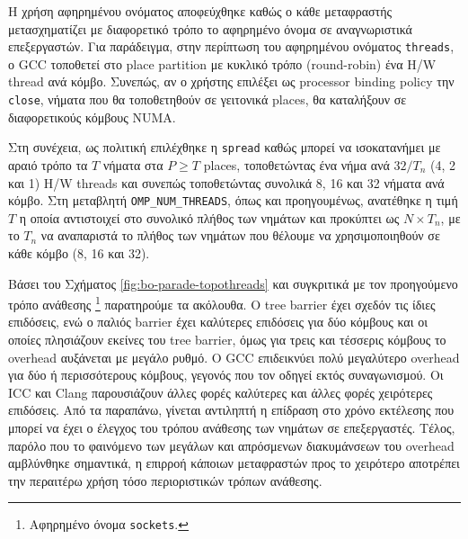 Η χρήση αφηρημένου ονόματος αποφεύχθηκε καθώς ο κάθε μεταφραστής μετασχηματίζει με διαφορετικό τρόπο το αφηρημένο όνομα σε αναγνωριστικά επεξεργαστών. Για παράδειγμα, στην περίπτωση του αφηρημένου ονόματος \texttt{threads}, ο GCC τοποθετεί στο place partition με κυκλικό τρόπο (round-robin) ένα H/W thread ανά κόμβο. Συνεπώς, αν ο χρήστης επιλέξει ως processor binding policy την \texttt{close}, νήματα που θα τοποθετηθούν σε γειτονικά places, θα καταλήξουν σε διαφορετικούς κόμβους NUMA.

Στη συνέχεια, ως πολιτική επιλέχθηκε η \texttt{spread} καθώς μπορεί να ισοκατανήμει με αραιό τρόπο τα $T$ νήματα στα $P \geq T$ places, τοποθετώντας ένα νήμα ανά $32 / T_n$ (4, 2 και 1) H/W threads και συνεπώς τοποθετώντας συνολικά 8, 16 και 32 νήματα ανά κόμβο. Στη μεταβλητή \texttt{OMP\_NUM\_THREADS}, όπως και προηγουμένως, ανατέθηκε η τιμή $T$ η οποία αντιστοιχεί στο συνολικό πλήθος των νημάτων και προκύπτει ως $N \times T_n$, με το $T_n$ να αναπαριστά το πλήθος των νημάτων που θέλουμε να χρησιμοποιηθούν σε κάθε κόμβο (8, 16 και 32).

Βάσει του Σχήματος \ref{fig:bo-parade-topothreads} και συγκριτικά με τον προηγούμενο τρόπο ανάθεσης \footnote{Αφηρημένο όνομα \texttt{sockets}.} παρατηρούμε τα ακόλουθα. Ο tree barrier έχει σχεδόν τις ίδιες επιδόσεις, ενώ ο παλιός barrier έχει καλύτερες επιδόσεις για δύο κόμβους και οι οποίες πλησιάζουν εκείνες του tree barrier, όμως για τρεις και τέσσερις κόμβους το overhead αυξάνεται με μεγάλο ρυθμό. Ο GCC επιδεικνύει πολύ μεγαλύτερο overhead για δύο ή περισσότερους κόμβους, γεγονός που τον οδηγεί εκτός συναγωνισμού. Οι ICC και Clang παρουσιάζουν άλλες φορές καλύτερες και άλλες φορές χειρότερες επιδόσεις. Από τα παραπάνω, γίνεται αντιληπτή η επίδραση στο χρόνο εκτέλεσης που μπορεί να έχει ο έλεγχος του τρόπου ανάθεσης των νημάτων σε επεξεργαστές. Τέλος, παρόλο που το φαινόμενο των μεγάλων και απρόσμενων διακυμάνσεων του overhead αμβλύνθηκε σημαντικά, η επιρροή κάποιων μεταφραστών προς το χειρότερο αποτρέπει την περαιτέρω χρήση τόσο περιοριστικών τρόπων ανάθεσης.



